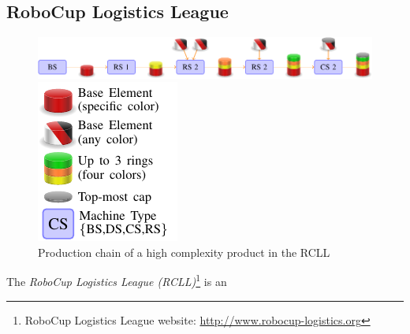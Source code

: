 \subsection{RoboCup Logistics League}
\begin{figure}[t]
  \centering
  \begin{minipage}{.8\linewidth}
  \includegraphics[width=\linewidth]{img/chain_c3}%
  \end{minipage}
  \quad%
  \begin{minipage}{.15\linewidth}
  \includegraphics[width=\linewidth]{img/legend}%
  \end{minipage}
  \caption[Production chain of a high complexity
    product in the RCLL]{Production chain of a high complexity
    product in the RCLL~\cite{chapter-cps}}
  \vspace{-2mm}
  \label{fig:prod-chain}
\end{figure}
The \emph{RoboCup Logistics League (RCLL)}\footnote{RoboCup Logistics
  League website: \url{http://www.robocup-logistics.org}} is an
